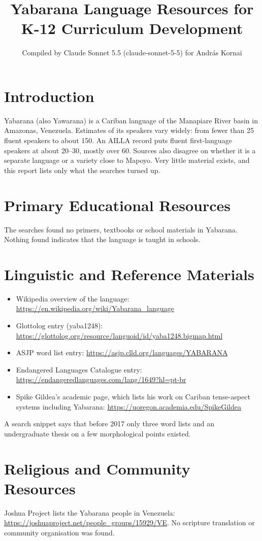 \documentclass[12pt]{article}
\title{Yabarana Language Resources for K-12 Curriculum Development}
\author{Compiled by Claude Sonnet 5.5 (claude-sonnet-5-5) for Andr\'as Kornai}
\date{}
\begin{document}
\maketitle

\section{Introduction}
Yabarana (also Yawarana) is a Cariban language of the Manapiare River basin in Amazonas, Venezuela. Estimates of its speakers vary widely: from fewer than 25 fluent speakers to about 150. An AILLA record puts fluent first-language speakers at about 20--30, mostly over 60. Sources also disagree on whether it is a separate language or a variety close to Mapoyo. Very little material exists, and this report lists only what the searches turned up.

\section{Primary Educational Resources}
The searches found no primers, textbooks or school materials in Yabarana. Nothing found indicates that the language is taught in schools.

\section{Linguistic and Reference Materials}
\begin{itemize}
\item Wikipedia overview of the language: \url{https://en.wikipedia.org/wiki/Yabarana_language}
\item Glottolog entry (yaba1248): \url{https://glottolog.org/resource/languoid/id/yaba1248.bigmap.html}
\item ASJP word list entry: \url{https://asjp.clld.org/languages/YABARANA}
\item Endangered Languages Catalogue entry: \url{https://endangeredlanguages.com/lang/1649?hl=pt-br}
\item Spike Gildea's academic page, which lists his work on Cariban tense-aspect systems including Yabarana: \url{https://uoregon.academia.edu/SpikeGildea}
\end{itemize}
A search snippet says that before 2017 only three word lists and an undergraduate thesis on a few morphological points existed.

\section{Religious and Community Resources}
Joshua Project lists the Yabarana people in Venezuela: \url{https://joshuaproject.net/people_groups/15929/VE}. No scripture translation or community organisation was found.
\end{document}
